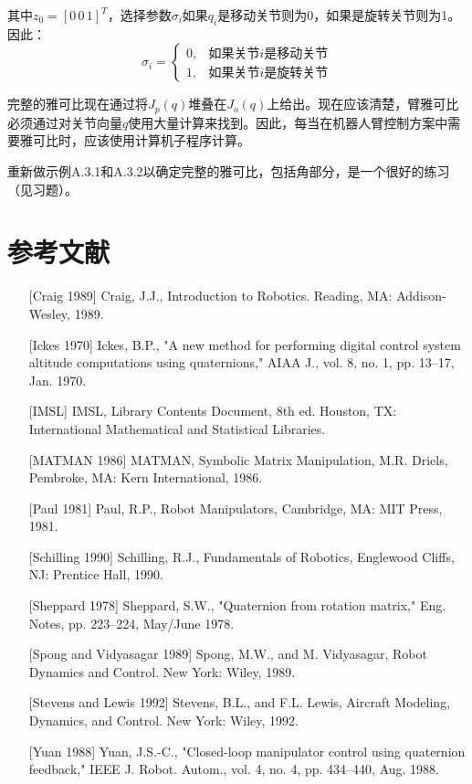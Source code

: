 \documentclass[UTF8,a4paper]{ctexart}
\begin{document}
其中$z_0 = [0 \, 0 \, 1]^T$，选择参数$\sigma_i$如果$q_i$是移动关节则为0，如果是旋转关节则为1。因此：
\begin{equation}
\sigma_i = \begin{cases} 0, & \text{如果关节}i\text{是移动关节} \\ 1, & \text{如果关节}i\text{是旋转关节} \end{cases}
\tag{A.3.36}
\end{equation}

完整的雅可比现在通过将$J_p(q)$堆叠在$J_o(q)$上给出。现在应该清楚，臂雅可比必须通过对关节向量$q$使用大量计算来找到。因此，每当在机器人臂控制方案中需要雅可比时，应该使用计算机子程序计算。

重新做示例A.3.1和A.3.2以确定完整的雅可比，包括角部分，是一个很好的练习（见习题）。

\section*{参考文献}

\begin{enumerate}
    \item[{[Craig 1989]}] Craig, J.J., Introduction to Robotics. Reading, MA: Addison-Wesley, 1989.
    
    \item[{[Ickes 1970]}] Ickes, B.P., "A new method for performing digital control system altitude computations using quaternions," AIAA J., vol. 8, no. 1, pp. 13--17, Jan. 1970.
    
    \item[{[IMSL]}] IMSL, Library Contents Document, 8th ed. Houston, TX: International Mathematical and Statistical Libraries.
    
    \item[{[MATMAN 1986]}] MATMAN, Symbolic Matrix Manipulation, M.R. Driels, Pembroke, MA: Kern International, 1986.
    
    \item[{[Paul 1981]}] Paul, R.P., Robot Manipulators, Cambridge, MA: MIT Press, 1981.
    
    \item[{[Schilling 1990]}] Schilling, R.J., Fundamentals of Robotics, Englewood Cliffs, NJ: Prentice Hall, 1990.
    
    \item[{[Sheppard 1978]}] Sheppard, S.W., "Quaternion from rotation matrix," Eng. Notes, pp. 223--224, May/June 1978.
    
    \item[{[Spong and Vidyasagar 1989]}] Spong, M.W., and M. Vidyasagar, Robot Dynamics and Control. New York: Wiley, 1989.
    
    \item[{[Stevens and Lewis 1992]}] Stevens, B.L., and F.L. Lewis, Aircraft Modeling, Dynamics, and Control. New York: Wiley, 1992.
    
    \item[{[Yuan 1988]}] Yuan, J.S.-C., "Closed-loop manipulator control using quaternion feedback," IEEE J. Robot. Autom., vol. 4, no. 4, pp. 434--440, Aug. 1988.
\end{enumerate}

\ifstandalone
  
\end{document}
